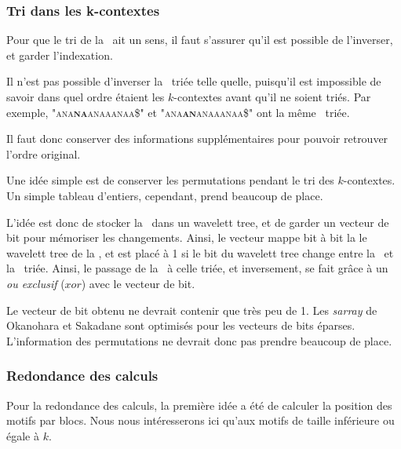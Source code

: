 \subsubsection{Tri dans les k-contextes}
Pour que le tri de la \kbwt\ ait un sens, il faut s'assurer qu'il est possible de l'inverser, et garder l'indexation.

Il n'est pas possible d'inverser la \kbwt\ triée telle quelle, puisqu'il est impossible de savoir dans quel ordre étaient les $k$-contextes avant qu'il ne soient triés. Par exemple, \textsc{"ana\textbf{na}anaaanaa\$"} et \textsc{"ana\textbf{an}anaaanaa\$"} ont la même \kbwt\ triée.

Il faut donc conserver des informations supplémentaires pour pouvoir retrouver l'ordre original.

Une idée simple est de conserver les permutations pendant le tri des $k$-contextes. Un simple tableau d'entiers, cependant, prend beaucoup de place.

L'idée est donc de stocker la \kbwt\ dans un wavelett tree, et de garder un vecteur de bit pour mémoriser les changements. Ainsi, le vecteur mappe bit à bit la le wavelett tree de la \kbwt, et est placé à 1 si le bit du wavelett tree change entre la \kbwt\ et la \kbwt\ triée. Ainsi, le passage de la \kbwt\ à celle triée, et inversement, se fait grâce à un \textit{ou exclusif} ($xor$) avec le vecteur de bit.

Le vecteur de bit obtenu ne devrait contenir que très peu de 1. Les \textit{sarray} de Okanohara et Sakadane sont optimisés pour les vecteurs de bits éparses. L'information des permutations ne devrait donc pas prendre beaucoup de place.


\subsubsection{Redondance des calculs}
Pour la redondance des calculs, la première idée a été de calculer la position des motifs par blocs. Nous nous intéresserons ici qu'aux motifs de taille inférieure ou égale à $k$. 

